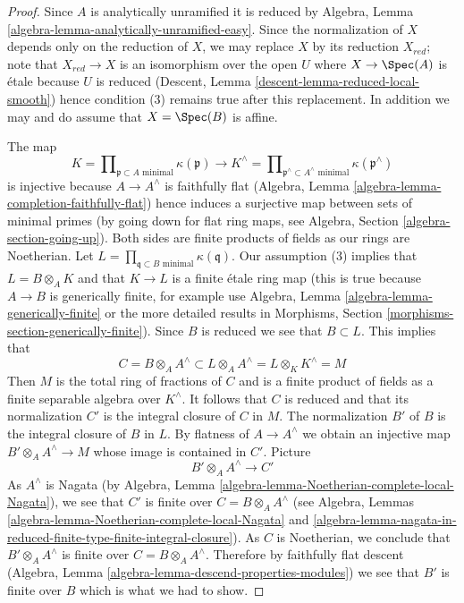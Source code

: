 \begin{proof}
Since $A$ is analytically unramified it is reduced
by Algebra, Lemma \ref{algebra-lemma-analytically-unramified-easy}.
Since the normalization of $X$ depends only on the reduction
of $X$, we may replace $X$ by its reduction $X_{red}$; note
that $X_{red} \to X$ is an isomorphism over the open $U$ where
$X \to \Spec(A)$ is \'etale because $U$ is reduced
(Descent, Lemma \ref{descent-lemma-reduced-local-smooth})
hence condition (3) remains true after this replacement.
In addition we may and do assume that $X = \Spec(B)$ is affine.

\medskip\noindent
The map
$$
K = \prod\nolimits_{\mathfrak p \subset A\text{ minimal}} \kappa(\mathfrak p)
\longrightarrow
K^\wedge = \prod\nolimits_{\mathfrak p^\wedge \subset A^\wedge\text{ minimal}}
\kappa(\mathfrak p^\wedge)
$$
is injective because $A \to A^\wedge$ is faithfully flat
(Algebra, Lemma \ref{algebra-lemma-completion-faithfully-flat})
hence induces a surjective map between sets of minimal primes
(by going down for flat ring maps, see
Algebra, Section \ref{algebra-section-going-up}).
Both sides are finite products of fields as our rings are Noetherian.
Let $L = \prod_{\mathfrak q \subset B\text{ minimal}} \kappa(\mathfrak q)$.
Our assumption (3) implies that $L = B \otimes_A K$ and that
$K \to L$ is a finite \'etale ring map (this is true
because $A \to B$ is generically finite, for example use
Algebra, Lemma \ref{algebra-lemma-generically-finite}
or the more detailed results in Morphisms, Section
\ref{morphisms-section-generically-finite}).
Since $B$ is reduced we see that $B \subset L$.
This implies that
$$
C = B \otimes_A A^\wedge \subset
L \otimes_A A^\wedge = L \otimes_K K^\wedge = M
$$
Then $M$ is the total ring of fractions of $C$ and
is a finite product of fields as a finite separable
algebra over $K^\wedge$. It follows that $C$ is reduced
and that its normalization $C'$ is the integral closure of
$C$ in $M$. The normalization $B'$ of $B$ is the integral
closure of $B$ in $L$. By flatness of $A \to A^\wedge$
we obtain an injective map $B' \otimes_A A^\wedge \to M$ whose
image is contained in $C'$. Picture
$$
B' \otimes_A A^\wedge \longrightarrow C'
$$
As $A^\wedge$ is Nagata (by
Algebra, Lemma \ref{algebra-lemma-Noetherian-complete-local-Nagata}),
we see that $C'$ is finite over
$C = B \otimes_A A^\wedge$ (see
Algebra, Lemmas
\ref{algebra-lemma-Noetherian-complete-local-Nagata} and
\ref{algebra-lemma-nagata-in-reduced-finite-type-finite-integral-closure}).
As $C$ is Noetherian, we conclude that
$B' \otimes_A A^\wedge$ is finite over $C = B \otimes_A A^\wedge$.
Therefore by faithfully flat descent
(Algebra, Lemma \ref{algebra-lemma-descend-properties-modules})
we see that $B'$ is finite over $B$ which is what we had to show.
\end{proof}

